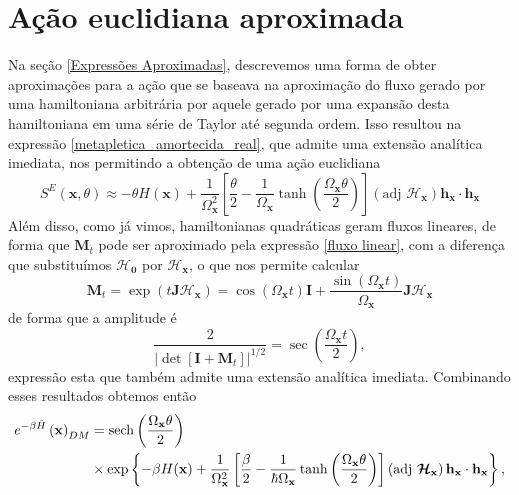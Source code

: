 \documentclass[
	12pt,
	oneside,			%
	a4paper,			%
	english,			%
	brazil				%
	]{abntex2}
\theoremstyle{definition}
\begin{document}
\section{Ação euclidiana aproximada}
\label{Ações euclidianas aproximadas}

Na seção \ref{Expressões Aproximadas}, descrevemos uma forma de obter aproximações para a ação que se baseava na aproximação do fluxo gerado por uma hamiltoniana arbitrária por aquele gerado por uma expansão desta hamiltoniana em uma série de Taylor até segunda ordem. Isso resultou na expressão \eqref{metapletica_amortecida_real}, que admite uma extensão analítica imediata, nos permitindo a obtenção de uma ação euclidiana
\begin{equation}
    S^E(\mathbf{x},\theta) \approx -\theta H(\mathbf{x}) + \frac{1}{\Omega_\mathbf{x}^2}\left[\frac{\theta}{2}-\frac{1}{\Omega_\mathbf{x}}\tanh \left(\frac{\Omega_\mathbf{x} \theta}{2}\right)\right] \left( \text{adj } \boldsymbol{\mathcal{H}}_\mathbf{x} \right) \mathbf{h}_\mathbf{x} \cdot \mathbf{h}_\mathbf{x}
\end{equation}
Além disso, como já vimos, hamiltonianas quadráticas geram fluxos lineares, de forma que $\mathbf{M}_t$ pode ser aproximado pela expressão \eqref{fluxo linear}, com a diferença que substituímos $\boldsymbol{\mathcal{H}_0}$ por $\boldsymbol{\mathcal{H}_\mathbf{x}}$, o que nos permite calcular 
\begin{equation}
    \mathbf{M}_t = \exp\left( t \mathbf{J} \boldsymbol{\mathcal{H}_\mathbf{x}}\right) = \cos \left( \Omega_\mathbf{x} t\right) \mathbf{I} + \frac{\sin \left( \Omega_\mathbf{x} t\right)}{\Omega_\mathbf{x}} \mathbf{J} \boldsymbol{\mathcal{H}_\mathbf{x}}
\end{equation}
de forma que a amplitude é
\begin{equation}
    \frac{2}{\left|\det \left[ \mathbf{I} + \mathbf{M}_{t}\right] \right|^{1/2} } = \sec \left( \frac{\Omega_\mathbf{x} t}{2} \right),
\end{equation}
expressão esta que também admite uma extensão analítica imediata. Combinando esses resultados obtemos então
\begin{equation}
    \begin{aligned}
        e^{-\beta \hat{H}} \left( \mathbf{x}\right)_{DM} &= \sech \left(\frac{\Omega_\mathbf{x} \theta}{2}\right)\\ &\times \exp \left\{-\beta H(\mathbf{x}) + \frac{1}{\Omega_\mathbf{x}^2}\left[\frac{\beta}{2}-\frac{1}{\hbar\Omega_\mathbf{x}}\tanh \left(\frac{\Omega_\mathbf{x} \theta}{2}\right)\right] \left( \text{adj } \boldsymbol{\mathcal{H}}_\mathbf{x} \right) \mathbf{h}_\mathbf{x} \cdot \mathbf{h}_\mathbf{x}\right\},
    \end{aligned}
\end{equation}
\end{document}
